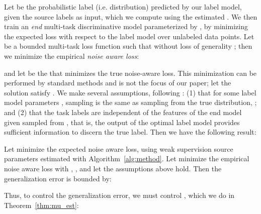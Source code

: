 \documentclass[letterpaper]{article}
\begin{document}
Let  be the probabilistic label (i.e. distribution) predicted by our label model, given the source labels  as input, which we compute using the estimated .
We then train an \textit{end} multi-task discriminative model  parameterized by , by minimizing the expected loss with respect to the label model over  unlabeled data points.
Let  be a bounded multi-task loss function such that without loss of generality ; then we minimize the empirical \textit{noise aware loss}:

and let  be the  that minimizes the true noise-aware loss.
This minimization can be performed by standard methods and is not the focus of our paper; let the solution  satisfy .
We make several assumptions, following \cite{ratner2016data}: (1) that for some label model parameters , sampling  is the same as sampling from the true distribution, ; and (2) that the task labels  are independent of the features of the end model given  sampled from , that is, the output of the optimal label model provides sufficient information to discern the true label.
Then we have the following result:
\begin{theorem}
	Let  minimize the expected noise aware loss, using weak supervision source parameters  estimated with Algorithm~\ref{alg:method}.
	Let  minimize the empirical noise aware loss with , , and let the assumptions above hold. Then the generalization error is bounded by:
    
\end{theorem}
Thus, to control the generalization error, we must control , which
we do in Theorem~\ref{thm:mu_est}:

 
\end{document}
